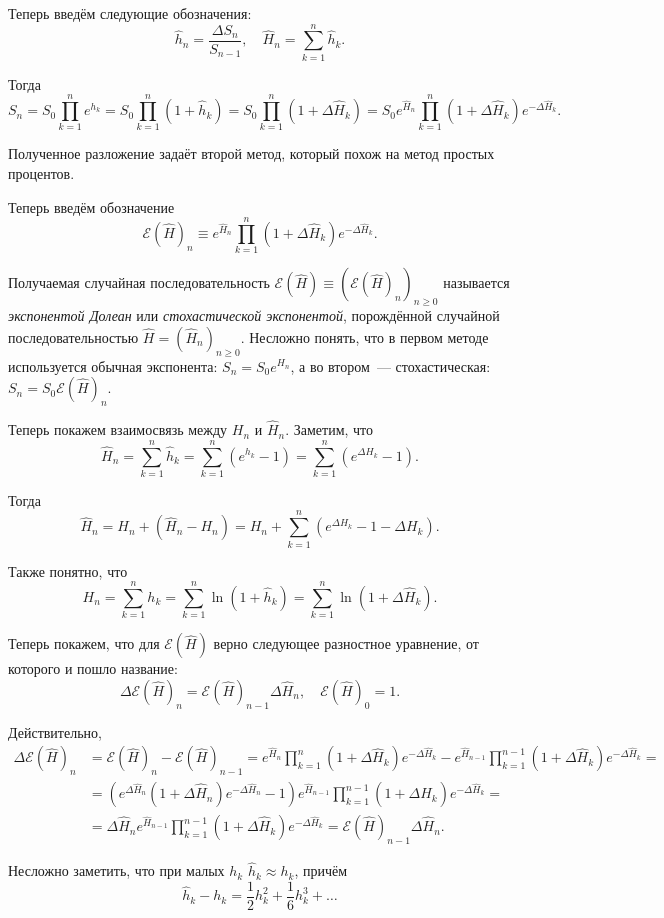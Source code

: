 Теперь введём следующие обозначения:
\[
	\hat{h}_{n} = \frac{\Delta S_{n}}{S_{n - 1}}, \quad \hat{H}_{n} = \sum_{k = 
	1}^{n} \hat{h}_{k}.
\]

Тогда 
\[
	S_{n} = S_{0} \prod_{k = 1}^{n}e^{h_{k}} = S_{0} \prod_{k = 1}^{n} (1 + 
	\hat{h}_{k}) = S_{0} \prod_{k = 1}^{n} (1 + \Delta\hat{H}_{k}) = 
	S_{0}e^{\hat{H}_{n}} \prod_{k = 1}^{n} (1 + \Delta\hat{H}_{k}) 
	e^{-\Delta\hat{H}_{k}}.
\]

Полученное разложение задаёт второй метод, который похож на метод простых 
процентов.

Теперь введём обозначение
\[
	\mathcal{E}(\hat{H})_{n} \equiv e^{\hat{H}_{n}} \prod_{k = 1}^{n} (1 + 
	\Delta\hat{H}_{k}) e^{-\Delta\hat{H}_{k}}.
\]

Получаемая случайная последовательность \(\mathcal{E}(\hat{H}) \equiv 
(\mathcal{E}(\hat{H})_{n})_{n \geq 0}\) называется \emph{экспонентой Долеан} 
или \emph{стохастической экспонентой}, порождённой случайной 
последовательностью \(\hat{H} = (\hat{H}_{n})_{n \geq 0}\). Несложно понять, 
что в первом методе используется обычная экспонента: \(S_{n} = 
S_{0}e^{H_{n}}\), а во втором~--- стохастическая: \(S_{n} = S_{0} 
\mathcal{E}(\hat{H})_{n}\).

Теперь покажем взаимосвязь между \(H_{n}\) и \(\hat{H}_{n}\). Заметим, что
\[
	\hat{H}_{n} = \sum_{k = 1}^{n} \hat{h}_{k} = \sum_{k = 1}^{n}(e^{h_{k}} - 
	1) = \sum_{k = 1}^{n}(e^{\Delta H_{k}} - 1).
\]

Тогда
\[
	\hat{H}_{n} = H_{n} + (\hat{H}_{n} - H_{n}) = H_{n} + \sum_{k = 
	1}^{n}(e^{\Delta H_{k}} - 1 - \Delta H_{k}).
\]

Также понятно, что
\[
	H_{n} = \sum_{k = 1}^{n} h_{k} = \sum_{k = 1}^{n} \ln(1 + \hat{h}_{k}) = 
	\sum_{k = 1}^{n} \ln(1 + \Delta \hat{H}_{k}).
\]

Теперь покажем, что для \(\mathcal{E}(\hat{H})\) верно следующее разностное 
уравнение, от которого и пошло название:
\[
	\Delta\mathcal{E}(\hat{H})_{n} = \mathcal{E}(\hat{H})_{n - 
	1}\Delta\hat{H}_{n}, \quad \mathcal{E}(\hat{H})_{0} = 1.
\]

Действительно,
\begin{align*}
	\Delta\mathcal{E}(\hat{H})_{n} &= \mathcal{E}(\hat{H})_{n} - 
	\mathcal{E}(\hat{H})_{n - 1} = e^{\hat{H}_{n}} \prod_{k = 1}^{n} (1 + 
	\Delta\hat{H}_{k}) e^{-\Delta\hat{H}_{k}} - e^{\hat{H}_{n - 1}} \prod_{k = 
	1}^{n - 1} (1 + \Delta\hat{H}_{k}) e^{-\Delta\hat{H}_{k}} = \\
	&= (e^{\Delta\hat{H}_{n}}(1 + \Delta\hat{H}_{n})e^{-\Delta\hat{H}_{n}} - 
	1)e^{\hat{H}_{n - 1}} \prod_{k = 1}^{n - 1} (1 + \Delta\hat{H}_{k}) 
	e^{-\Delta\hat{H}_{k}} = \\
	&= \Delta\hat{H}_{n}e^{\hat{H}_{n - 1}} \prod_{k = 1}^{n - 1} (1 + 
	\Delta\hat{H}_{k}) e^{-\Delta\hat{H}_{k}} = \mathcal{E}(\hat{H})_{n - 
	1}\Delta\hat{H}_{n}.
\end{align*}
\begin{remark}
	Несложно заметить, что при малых \(h_{k}\) \(\hat{h}_{k} \approx h_{k}\), 
	причём
	\[
		\hat{h}_{k} - h_{k} = \frac{1}{2}h_{k}^{2} + \frac{1}{6}h_{k}^{3} + 
		\ldots
	\]
\end{remark}

